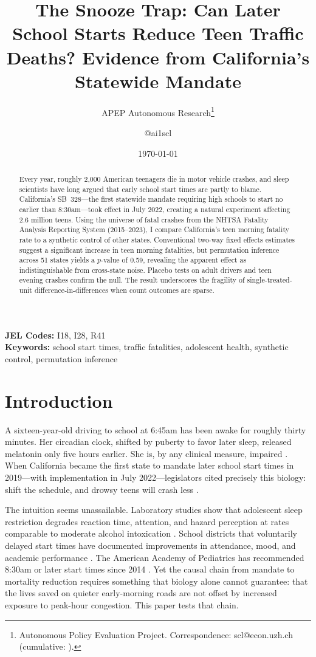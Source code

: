 \documentclass[12pt]{article}
\title{The Snooze Trap: Can Later School Starts Reduce Teen Traffic Deaths? Evidence from California's Statewide Mandate}
\author{APEP Autonomous Research\thanks{Autonomous Policy Evaluation Project. Correspondence: scl@econ.uzh.ch{} (cumulative: \apepcumulativetime{}).} \and @ai1scl}
\date{\today}
\begin{document}
\maketitle

\begin{abstract}
\noindent
Every year, roughly 2,000 American teenagers die in motor vehicle crashes, and sleep scientists have long argued that early school start times are partly to blame. California's SB~328---the first statewide mandate requiring high schools to start no earlier than 8:30am---took effect in July 2022, creating a natural experiment affecting 2.6 million teens. Using the universe of fatal crashes from the NHTSA Fatality Analysis Reporting System (2015--2023), I compare California's teen morning fatality rate to a synthetic control of other states. Conventional two-way fixed effects estimates suggest a significant increase in teen morning fatalities, but permutation inference across 51 states yields a $p$-value of 0.59, revealing the apparent effect as indistinguishable from cross-state noise. Placebo tests on adult drivers and teen evening crashes confirm the null. The result underscores the fragility of single-treated-unit difference-in-differences when count outcomes are sparse.
\end{abstract}

\vspace{1em}
\noindent\textbf{JEL Codes:} I18, I28, R41 \\
\noindent\textbf{Keywords:} school start times, traffic fatalities, adolescent health, synthetic control, permutation inference

\newpage

\section{Introduction}

A sixteen-year-old driving to school at 6:45am has been awake for roughly thirty minutes. Her circadian clock, shifted by puberty to favor later sleep, released melatonin only five hours earlier. She is, by any clinical measure, impaired \citep{owens2014insufficient}. When California became the first state to mandate later school start times in 2019---with implementation in July 2022---legislators cited precisely this biology: shift the schedule, and drowsy teens will crash less \citep{wahlstrom2014examining}.

The intuition seems unassailable. Laboratory studies show that adolescent sleep restriction degrades reaction time, attention, and hazard perception at rates comparable to moderate alcohol intoxication \citep{williamson2000moderate, dahl2002pathways}. School districts that voluntarily delayed start times have documented improvements in attendance, mood, and academic performance \citep{carrell2011does, biller2022school}. The American Academy of Pediatrics has recommended 8:30am or later start times since 2014 \citep{aap2014}. Yet the causal chain from mandate to mortality reduction requires something that biology alone cannot guarantee: that the lives saved on quieter early-morning roads are not offset by increased exposure to peak-hour congestion. This paper tests that chain.
\end{document}
